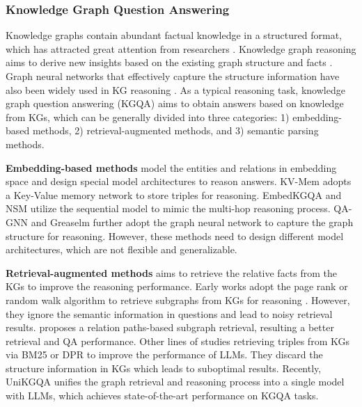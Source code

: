 \subsubsection{Knowledge Graph Question Answering}
Knowledge graphs contain abundant factual knowledge in a structured format, which has attracted great attention from researchers \citep{zheng2022multi,zheng2023towards,pan2023integrating,Liangke_SymCLKG_TKDE}. Knowledge graph reasoning aims to derive new insights based on the existing graph structure and facts \citep{Liangke_Survey,wang2023survey,luo2023npfkgc,zhao2023towards}. Graph neural networks that effectively capture the structure information have also been widely used in KG reasoning \cite{zheng2022rethinking,zheng2023finding,zheng2023gnnevaluator,zheng2023structure,liu2023learning,liu2024towards}.
%
As a typical reasoning task, knowledge graph question answering (KGQA) aims to obtain answers based on knowledge from KGs, which can be generally divided into three categories: 1) embedding-based methods, 2) retrieval-augmented methods, and 3) semantic parsing methods.

\textbf{Embedding-based methods} model the entities and relations in embedding space and design special model architectures to reason answers. KV-Mem \citep{miller2016key} adopts a Key-Value memory network to store triples for reasoning. EmbedKGQA \citep{saxena2020improving} and NSM \citep{he2021improving} utilize the sequential model to mimic the multi-hop reasoning process. QA-GNN \citep{yasunaga2021qa} and Greaselm \citep{zhang2021greaselm} further adopt the graph neural network to capture the graph structure for reasoning. However, these methods need to design different model architectures, which are not flexible and generalizable.

\textbf{Retrieval-augmented methods} aims to retrieve the relative facts from the KGs to improve the reasoning performance. Early works adopt the page rank or random walk algorithm to retrieve subgraphs from KGs for reasoning \citep{sun2018open, sun2019pullnet}. However, they ignore the semantic information in questions and lead to noisy retrieval results. \citet{zhang2022subgraph} proposes a relation paths-based subgraph retrieval, resulting a better retrieval and QA performance. Other lines of studies retrieving triples from KGs via BM25 \citep{li2023graph} or DPR \citep{karpukhin2020dense, yu2022kg} to improve the performance of LLMs. They discard the structure information in KGs which leads to suboptimal results. Recently, UniKGQA \citep{jiang2022unikgqa} unifies the graph retrieval and reasoning process into a single model with LLMs, which achieves state-of-the-art performance on KGQA tasks.

